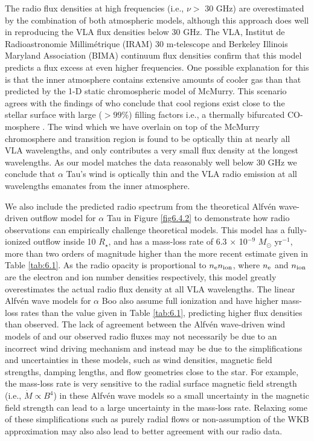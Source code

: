The radio flux densities at high frequencies (i.e., $\nu >$ 30 GHz) are overestimated by the combination of both atmospheric models, although this approach does well in reproducing the VLA flux densities below 30 GHz. The VLA, Institut de Radioastronomie Millim\'{e}trique (IRAM) 30 m-telescope and Berkeley Illinois Maryland Association (BIMA) continuum flux densities confirm that this model predicts a flux excess at even higher frequencies. One possible explanation for this is that the inner atmosphere contains extensive amounts of cooler gas than that predicted by the 1-D static chromospheric model of McMurry. This scenario agrees with the findings of \cite{wiedemann_1994} who conclude that cool regions exist close to the stellar surface with large ($> 99 \%$) filling factors i.e., a thermally bifurcated CO-mosphere \citep{ayres_1996}. The wind which we have overlain on top of the McMurry chromosphere and transition region is found to be optically thin at nearly all VLA wavelengths, and only contributes a very small flux density at the longest wavelengths. As our model matches the data reasonably well below 30 GHz we conclude that $\alpha$ Tau's wind is optically thin and the VLA radio emission at all wavelengths emanates from the inner atmosphere. 

We also include the predicted radio spectrum from the theoretical Alfv\'{e}n wave-driven outflow model for $\alpha$ Tau \citep{krogulec_1989} in Figure \ref{fig6.4.2} to demonstrate how radio observations can empirically challenge theoretical models. This model has a fully-ionized outflow inside 10 $R_{\star}$, and has a mass-loss rate of  6.3 $\times$ 10$^{-9}$ $M_{\odot}$ yr$^{-1}$, more than two orders of magnitude higher than the more recent estimate given in Table \ref{tab:6.1}. As the radio opacity is proportional to $n _{\rm{e}} n _{\rm{ion}}$, where $n_{\rm{e}}$ and $n_{\rm{ion}}$ are the electron and ion number densities respectively, this model greatly overestimates the actual radio flux density at all VLA wavelengths. The linear Alfv\'{e}n wave models for $\alpha$ Boo \citep{krogulec_1988} also assume full ionization and have higher mass-loss rates than the value given in Table \ref{tab:6.1}, predicting higher flux densities than observed. The lack of agreement between the Alfv\'en wave-driven wind models of \cite{krogulec_1988,krogulec_1989} and our observed radio fluxes may not necessarily be due to an incorrect  wind driving mechanism and instead may be due to the simplifications and  uncertainties in these models, such as wind densities, magnetic field strengths, damping lengths, and flow geometries close to the star. For example, the mass-loss rate is very sensitive to the radial surface magnetic field strength (i.e., $\dot{M} \propto B^4$) in these Alfv\'en wave models \citep{holzer_1983} so a small uncertainty in the magnetic field strength can lead to a large uncertainty in the mass-loss rate. Relaxing some of these simplifications such as purely radial flows or non-assumption of the WKB approximation \citep{charbonneau_1995} may also also lead to better agreement with our radio data.


